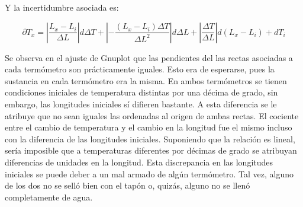 \documentclass{article}
\begin{document}
Y la incertidumbre asociada es: 

$$\partial T_x = \left| \frac{L_x - L_i}{\Delta L} \right| d\Delta T + \left| - \frac{(L_x - L_i) \Delta T}{\Delta L^2} \right| d\Delta L + \left| \frac{\Delta T}{\Delta L} \right| d(L_x - L_i) + dT_i $$

Se observa en el ajuste de Gnuplot que las pendientes del las rectas asociadas a cada termómetro son prácticamente iguales. Esto era de esperarse, pues la sustancia en cada termómetro era la misma. En ambos termómetros se tienen condiciones iniciales de temperatura distintas por una décima de grado, sin embargo, las longitudes iniciales sí difieren bastante. A esta diferencia se le atribuye que no sean iguales las ordenadas al origen de ambas rectas. El cociente entre el cambio de temperatura y el cambio en la longitud fue el mismo incluso con la diferencia de las longitudes iniciales. Suponiendo que la relación es lineal, sería imposible que a temperaturas diferentes por décimas de grado se atribuyan diferencias de unidades en la longitud. Esta discrepancia en las longitudes iniciales se puede deber a un mal armado de algún termómetro. Tal vez, alguno de los dos no se selló bien con el tapón o, quizás, alguno no se llenó completamente de agua. 
\end{document}
